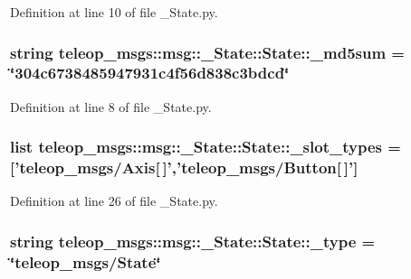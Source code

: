 Definition at line 10 of file \_\-State.py.

\subsubsection[{\_\-md5sum}]{\setlength{\rightskip}{0pt plus 5cm}string {\bf teleop\_\-msgs::msg::\_\-State::State::\_\-md5sum} = \char`\"{}304c6738485947931c4f56d838c3bdcd\char`\"{}\hspace{0.3cm}{\ttfamily  [static, private]}}\label{classteleop__msgs_1_1msg_1_1__State_1_1State_a829b062ab72bad2ce0d1748e2dc5fc74}


Definition at line 8 of file \_\-State.py.

\subsubsection[{\_\-slot\_\-types}]{\setlength{\rightskip}{0pt plus 5cm}list {\bf teleop\_\-msgs::msg::\_\-State::State::\_\-slot\_\-types} = ['teleop\_\-msgs/{\bf Axis}[$\,$]','teleop\_\-msgs/{\bf Button}[$\,$]']\hspace{0.3cm}{\ttfamily  [static, private]}}\label{classteleop__msgs_1_1msg_1_1__State_1_1State_a87d1d189ff81911d76a6d179be73928f}


Definition at line 26 of file \_\-State.py.

\subsubsection[{\_\-type}]{\setlength{\rightskip}{0pt plus 5cm}string {\bf teleop\_\-msgs::msg::\_\-State::State::\_\-type} = \char`\"{}teleop\_\-msgs/{\bf State}\char`\"{}\hspace{0.3cm}{\ttfamily  [static, private]}}\label{classteleop__msgs_1_1msg_1_1__State_1_1State_a79d5101413984daa237b343bfd1e7dac}


